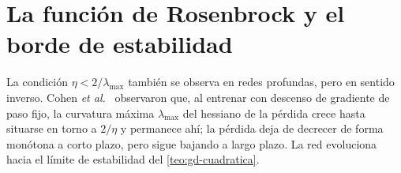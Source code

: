 \section{La función de Rosenbrock y el borde de estabilidad}

\addtocounter{definicion}{1}%

\begin{observacion}\label{obs:borde}
La condición $\eta<2/\lambda_{\max}$ también se observa en redes profundas, pero en sentido inverso. Cohen \emph{et al.}~\cite{cohen} observaron que, al entrenar con descenso de gradiente de paso fijo, la curvatura máxima $\lambda_{\max}$ del hessiano de la pérdida crece hasta situarse en torno a $2/\eta$ y permanece ahí; la pérdida deja de decrecer de forma monótona a corto plazo, pero sigue bajando a largo plazo. La red evoluciona hacia el límite de estabilidad del \cref{teo:gd-cuadratica}.
\end{observacion}

